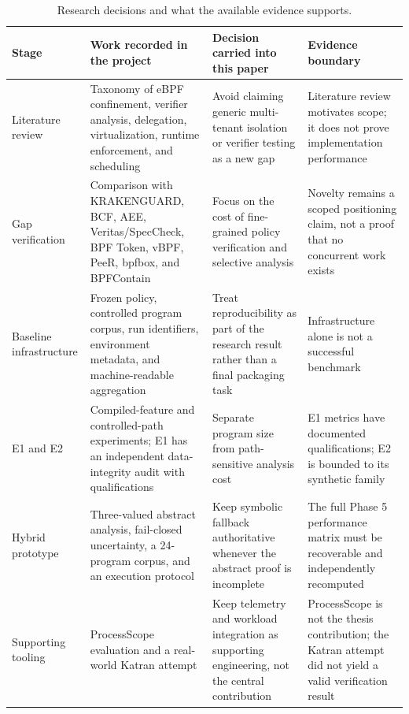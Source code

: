 \begin{table}[t]
\centering
\caption{Research decisions and what the available evidence supports.}
\label{tab:phase-history}
\begin{tabular}{P{0.13\textwidth}P{0.27\textwidth}P{0.27\textwidth}P{0.23\textwidth}}
\toprule
Stage & Work recorded in the project & Decision carried into this paper & Evidence boundary \\
\midrule
Literature review & Taxonomy of eBPF confinement, verifier analysis, delegation, virtualization, runtime enforcement, and scheduling & Avoid claiming generic multi-tenant isolation or verifier testing as a new gap & Literature review motivates scope; it does not prove implementation performance \\
Gap verification & Comparison with KRAKENGUARD, BCF, AEE, Veritas/SpecCheck, BPF Token, vBPF, PeeR, bpfbox, and BPFContain & Focus on the cost of fine-grained policy verification and selective analysis & Novelty remains a scoped positioning claim, not a proof that no concurrent work exists \\
Baseline infrastructure & Frozen policy, controlled program corpus, run identifiers, environment metadata, and machine-readable aggregation & Treat reproducibility as part of the research result rather than a final packaging task & Infrastructure alone is not a successful benchmark \\
E1 and E2 & Compiled-feature and controlled-path experiments; E1 has an independent data-integrity audit with qualifications & Separate program size from path-sensitive analysis cost & E1 metrics have documented qualifications; E2 is bounded to its synthetic family \\
Hybrid prototype & Three-valued abstract analysis, fail-closed uncertainty, a 24-program corpus, and an execution protocol & Keep symbolic fallback authoritative whenever the abstract proof is incomplete & The full Phase 5 performance matrix must be recoverable and independently recomputed \\
Supporting tooling & ProcessScope evaluation and a real-world Katran attempt & Keep telemetry and workload integration as supporting engineering, not the central contribution & ProcessScope is not the thesis contribution; the Katran attempt did not yield a valid verification result \\
\bottomrule
\end{tabular}
\end{table}


